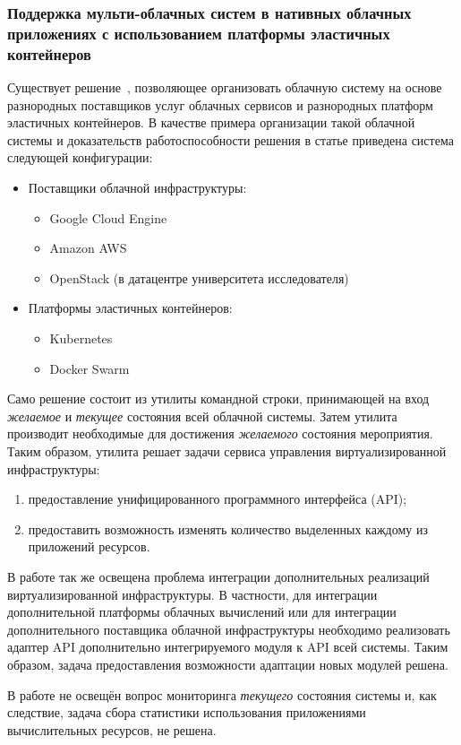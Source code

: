 \subsubsection*{Поддержка мульти-облачных систем в нативных облачных приложениях с использованием платформы эластичных контейнеров}
Существует решение~\cite{smuggling}, позволяющее организовать облачную систему на основе разнородных поставщиков услуг облачных сервисов и разнородных платформ эластичных контейнеров.
В качестве примера организации такой облачной системы и доказательств работоспособности решения в статье приведена система следующей конфигурации:
\begin{itemize}
    \item Поставщики облачной инфраструктуры:
    \begin{itemize}
        \item Google Cloud Engine
        \item Amazon AWS
        \item OpenStack (в датацентре университета исследователя)
    \end{itemize}
    \item Платформы эластичных контейнеров:
    \begin{itemize}
        \item Kubernetes
        \item Docker Swarm
    \end{itemize}
\end{itemize}

Само решение состоит из утилиты командной строки, принимающей на вход \textit{желаемое} и \textit{текущее} состояния всей облачной системы. 
Затем утилита производит необходимые для достижения \textit{желаемого} состояния мероприятия.
Таким образом, утилита решает задачи сервиса управления виртуализированной инфраструктуры:
\begin{enumerate}
    \item предоставление унифицированного программного интерфейса (API);
    \item предоставить возможность изменять количество выделенных каждому из приложений ресурсов.
\end{enumerate}

В работе так же освещена проблема интеграции дополнительных реализаций виртуализированной инфраструктуры.
В частности, для интеграции дополнительной платформы облачных вычислений или для интеграции дополнительного поставщика облачной инфраструктуры необходимо реализовать адаптер API дополнительно интегрируемого модуля к API всей системы.
Таким образом, задача предоставления возможности адаптации новых модулей решена.

В работе не освещён вопрос мониторинга \textit{текущего} состояния системы и, как следствие, задача сбора статистики использования приложениями вычислительных ресурсов, не решена.